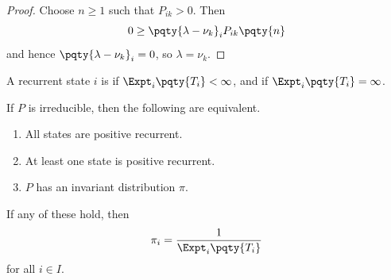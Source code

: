 \begin{proof}
    Choose \(n \geq 1\) such that \(P_{ik} > 0\). Then
    \[
        0 \geq \pqty{\lambda - \nu_k}_i P_{ik} \pqty{n}
    \]
    and hence \(\pqty{\lambda - \nu_k}_i = 0\), so \(\lambda = \nu_k\).
\end{proof}

\begin{definition}
    A recurrent state \(i\) is  if \(\Expt_i \pqty{T_i} < \infty\), and  if \(\Expt_i \pqty{T_i} = \infty\).
\end{definition}

\begin{theorem}
    If \(P\) is irreducible, then the following are equivalent.

    \begin{enumerate}[label=(\roman*)]
        \item All states are positive recurrent.
        \item At least one state is positive recurrent.
        \item \(P\) has an invariant distribution \(\pi\).
    \end{enumerate}

    If any of these hold, then
    \[
        \pi_i = \frac{1}{\Expt_i \pqty{T_i}}
    \]
    for all \(i \in I\).
\end{theorem}

